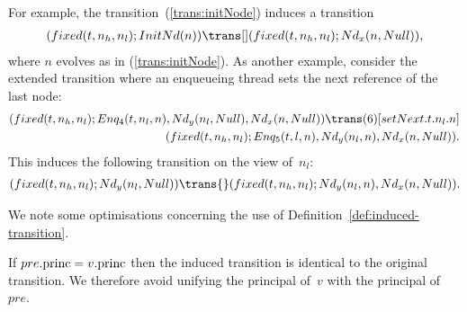 For example, the  transition~(\ref{trans:initNode}) induces a transition
\[
\begin{align}
(fixed(t, n_h, n_l); \InitNode(n)) \trans[]
  (fixed(t, n_h, n_l); \Node_x(n, Null)),
\end{align}
\]
where $n$ evolves as in (\ref{trans:initNode}).
%
As another example, consider the extended transition where an enqueueing
thread sets the next reference of the last node:
\[
\begin{align}
(fixed(t, n_h, n_l);  Enq_4(t, n_l, n), \Node_y(n_l, Null), \Node_x(n, Null)) 
 \trans(6)[setNext.t.n_l.n] \\
\qquad (fixed(t, n_h, n_l);  Enq_5(t, l, n), \Node_y(n_l, n), \Node_x(n, Null)).
\end{align}
\]
This induces the following transition on the view of~$n_l$:
\[
\begin{align}
(fixed(t, n_h, n_l);  \Node_y(n_l, Null)) \trans{}  %
  (fixed(t, n_h, n_l);  \Node_y(n_l, n), \Node_x(n, Null)).
\end{align}
\]


We note some optimisations concerning the use of
Definition~\ref{def:induced-transition}.  

\begin{opt}
If $pre.\mathrm{princ} = v.\mathrm{princ}$ then the induced transition is identical to the
original transition.  We therefore avoid unifying the principal of~$v$ with
the principal of~$pre$.
\end{opt}






